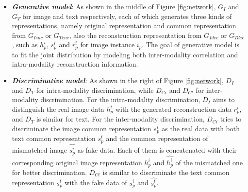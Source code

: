 \documentclass[journal]{IEEEtran}
\begin{document}
\begin{itemize}
	\item \textit{\textbf{Generative model}}: As shown in the middle of Figure \ref{fig:network}, $G_I$ and $G_T$ for image and text respectively, each of which generates three kinds of representations, namely original representation and common representation from $G_{Ienc}$ or $G_{Tenc}$, also the reconstruction representation from $G_{Idec}$ or $G_{Tdec}$, such as $h_p^i$, $s_p^i$ and $r_p^i$ for image instance $i_p$. The goal of generative model is to fit the joint distribution by modeling both inter-modality correlation and intra-modality reconstruction information.
	\item \textit{\textbf{Discriminative model}}: As shown in the right of Figure \ref{fig:network}, $D_I$ and $D_T$ for intra-modality discrimination, while $D_{Ci}$ and $D_{Ct}$ for inter-modality discrimination. For the intra-modality discrimination, $D_I$ aims to distinguish the real image data $h_p^i$ with the generated reconstruction data $r_p^i$, and $D_T$ is similar for text. For the inter-modality discrimination, $D_{Ci}$ tries to discriminate the image common representation $s_p^i$ as the real data with both text common representation $s_p^t$ and the common representation of mismatched image $\hat{s_p^i}$ as fake data. Each of them is concatenated with their corresponding original image representation $h_p^i$ and $\hat{h_p^i}$ of the mismatched one for better discrimination. $D_{Ct}$ is similar to discriminate the text common representation $s_p^t$ with the fake data of $s_p^i$ and $\hat{s_p^t}$.
\end{itemize}
\end{document}
